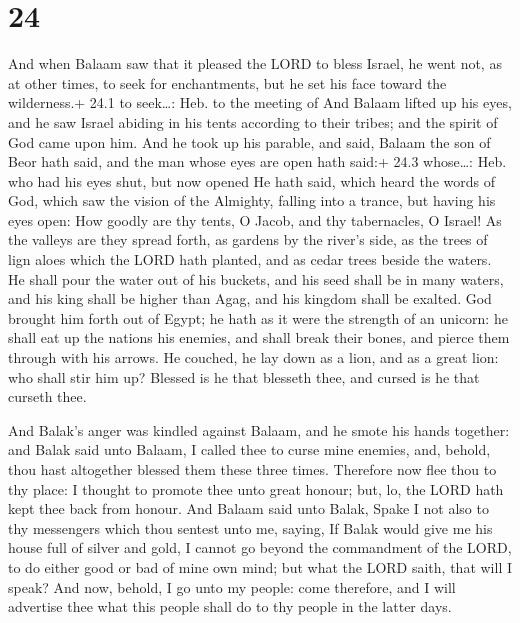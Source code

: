 \hypertarget{section-23}{%
\section{24}\label{section-23}}

 And when Balaam saw that it pleased the LORD to bless
Israel, he went not, as at other times, to seek for enchantments, but he
set his face toward the wilderness.+ 24.1 to seek\ldots: Heb. to the
meeting of  And Balaam lifted up his eyes, and he saw Israel
abiding in his tents according to their tribes; and the spirit of God
came upon him.  And he took up his parable, and said, Balaam
the son of Beor hath said, and the man whose eyes are open hath said:+
24.3 whose\ldots: Heb. who had his eyes shut, but now opened
 He hath said, which heard the words of God, which saw the
vision of the Almighty, falling into a trance, but having his eyes open:
 How goodly are thy tents, O Jacob, and thy tabernacles, O
Israel!  As the valleys are they spread forth, as gardens by
the river's side, as the trees of lign aloes which the LORD hath
planted, and as cedar trees beside the waters.  He shall
pour the water out of his buckets, and his seed shall be in many waters,
and his king shall be higher than Agag, and his kingdom shall be
exalted.  God brought him forth out of Egypt; he hath as it
were the strength of an unicorn: he shall eat up the nations his
enemies, and shall break their bones, and pierce them through with his
arrows.  He couched, he lay down as a lion, and as a great
lion: who shall stir him up? Blessed is he that blesseth thee, and
cursed is he that curseth thee.

 And Balak's anger was kindled against Balaam, and he
smote his hands together: and Balak said unto Balaam, I called thee to
curse mine enemies, and, behold, thou hast altogether blessed them these
three times.  Therefore now flee thou to thy place: I
thought to promote thee unto great honour; but, lo, the LORD hath kept
thee back from honour.  And Balaam said unto Balak, Spake I
not also to thy messengers which thou sentest unto me, saying,
 If Balak would give me his house full of silver and gold,
I cannot go beyond the commandment of the LORD, to do either good or bad
of mine own mind; but what the LORD saith, that will I speak?
 And now, behold, I go unto my people: come therefore, and
I will advertise thee what this people shall do to thy people in the
latter days.

